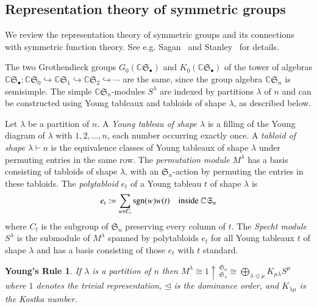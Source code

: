 \documentclass{amsart}
\newtheorem*{Young's Rule}{Young's Rule}
\theoremstyle{definition}
\theoremstyle{remark}
\numberwithin{equation}{section}
\begin{document}
\subsection{Representation theory of symmetric groups}
We review the representation theory of symmetric groups and its connections with symmetric function theory. See e.g. 
Sagan~\cite{Sagan} and Stanley~\cite[Chapter 7]{EC2} for details.  

The two Grothendieck groups $G_0({{\mathbb C}}{{\mathfrak S}}_\bullet)$ and $K_0({{\mathbb C}}{{\mathfrak S}}_\bullet)$ of the tower of algebras ${{\mathbb C}}{{\mathfrak S}}_\bullet: {{\mathbb C}}{{\mathfrak S}}_0\hookrightarrow{{\mathbb C}}{{\mathfrak S}}_1\hookrightarrow{{\mathbb C}}{{\mathfrak S}}_2\hookrightarrow\cdots$ are the same, since the group algebra ${{\mathbb C}}{{\mathfrak S}}_n$ is semisimple. The simple ${{\mathbb C}}{{\mathfrak S}}_n$-modules $S^\lambda$ are indexed by partitions $\lambda$ of $n$ and can be constructed using Young tableaux and tabloids of shape $\lambda$, as described below.

Let $\lambda$ be a partition of $n$. A \emph{Young tableau of shape $\lambda$} is a filling of the Young diagram of $\lambda$ with $1,2,\ldots,n$, each number occurring exactly once. 
A \emph{tabloid of shape $\lambda\vdash n$} is the equivalence classes of Young tableaux of shape $\lambda$ under permuting entries in the same row. The \emph{permutation module} $M^\lambda$ has a basis consisting of tabloids of shape $\lambda$, with an ${{\mathfrak S}}_n$-action by permuting the entries in these tabloids. The \emph{polytabloid} $e_t$ of a Young tableau $t$ of shape $\lambda$ is 
\[ e_t := \sum_{ w \in C_t } {\rm sgn}(w) w(t) \quad \text{inside}\ {{\mathbb C}}{{\mathfrak S}}_n\]
where $C_t$ is the subgroup of ${{\mathfrak S}}_n$ preserving every column of $t$. The \emph{Specht module} $S^\lambda$ is the submodule of $M^\lambda$ spanned by polytabloids $e_t$ for all Young tableaux $t$ of shape $\lambda$ and has a basis consisting of those $e_t$ with $t$ standard. 

\begin{Young's Rule}
If $\lambda$ is a partition of $n$ then
$ M^\lambda \cong 1 \uparrow\,_{{{\mathfrak S}}_\lambda}^{{{\mathfrak S}}_n} \cong \bigoplus_{\lambda\unlhd\mu} K_{\mu\lambda} S^\mu $
where $1$ denotes the trivial representation, $\unlhd$ is the dominance order, and $K_{\lambda\mu}$ is the \emph{Kostka number}. 
\end{Young's Rule}
\end{document}
